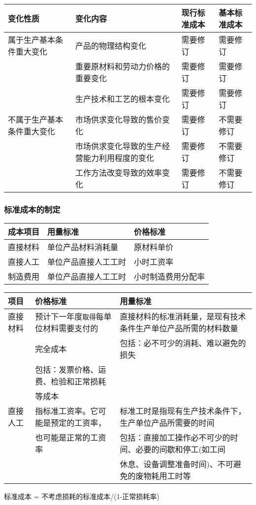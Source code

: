\documentclass[11pt]{article}
\begin{document}
\begin{enumerate}
\begin{center}
\begin{tabular}{llll}
变化性质 & 变化内容 & 现行标准成本 & 基本标准成本\\
\hline
属于生产基本条件重大变化 & 产品的物理结构变化 & 需要修订 & 需要修订\\
 & 重要原材料和劳动力价格的重要变化 & 需要修订 & 需要修订\\
 & 生产技术和工艺的根本变化 & 需要修订 & 需要修订\\
\hline
不属于生产基本条件重大变化 & 市场供求变化导致的售价变化 & 需要修订 & 不需要修订\\
 & 市场供求变化导致的生产经营能力利用程度的变化 & 需要修订 & 不需要修订\\
 & 工作方法改变导致的效率变化 & 需要修订 & 不需要修订\\
\end{tabular}
\end{center}
\end{enumerate}
\subsubsection{标准成本的制定}
\label{sec:org729d249}
\begin{center}
\begin{tabular}{lll}
成本项目 & 用量标准 & 价格标准\\
\hline
直接材料 & 单位产品材料消耗量 & 原材料单价\\
直接人工 & 单位产品直接人工工时 & 小时工资率\\
制造费用 & 单位产品直接人工工时 & 小时制造费用分配率\\
\end{tabular}
\end{center}

\begin{center}
\begin{tabular}{lll}
项目 & 价格标准 & 用量标准\\
\hline
直接材料 & 预计下一年度\texttt{取得}每单位材料需要支付的 & 直接材料的标准消耗量，是现有技术条件生产单位产品所需的材料数量\\
 & 完全成本 & 包括：必不可少的消耗、难以避免的损失\\
 & 包括：发票价格、运费、检验和正常损耗 & \\
 & 等成本 & \\
\hline
直接人工 & 指标准工资率。它可能是预定的工资率， & 标准工时是指现有生产技术条件下，生产单位产品所需要的时间\\
 & 也可能是正常的工资率 & 包括：直接加工操作必不可少的时间、必要的间歇和停工(如工间\\
 &  & 休息、设备调整准备时间)、不可避免的废物耗用工时等\\
\end{tabular}
\end{center}
标准成本 = 不考虑损耗的标准成本/(1-正常损耗率)
\end{document}
